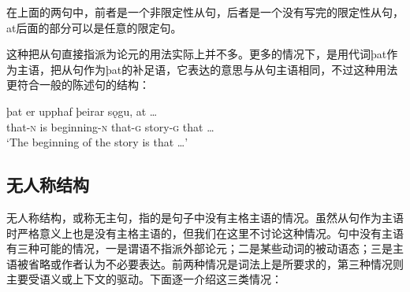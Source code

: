 在上面的两句中，前者是一个非限定性从句，后者是一个没有写完的限定性从句，at后面的部分可以是任意的限定句。

这种把从句直接指派为论元的用法实际上并不多。更多的情况下，是用代词þat作为主语，把从句作为þat的补足语，它表达的意思与从句主语相同，不过这种用法更符合一般的陈述句的结构：
\begin{exe}
    \ex
    \gll þat	er	upphaf	þeirar	sǫgu,	at	…\\
that-\textsc{n}	is	beginning-\textsc{n}	that-\textsc{g}	story-\textsc{g}	that	…\\
\trans `The beginning of the story is that …’
\end{exe}

\subsection{无人称结构}
\label{sec:impersonal}
无人称结构，或称无主句，指的是句子中没有主格主语的情况。虽然从句作为主语时严格意义上也是没有主格主语的，但我们在这里不讨论这种情况。句中没有主语有三种可能的情况，一是谓语不指派外部论元；二是某些动词的被动语态；三是主语被省略或作者认为不必要表达。前两种情况是词法上是所要求的，第三种情况则主要受语义或上下文的驱动。下面逐一介绍这三类情况：
